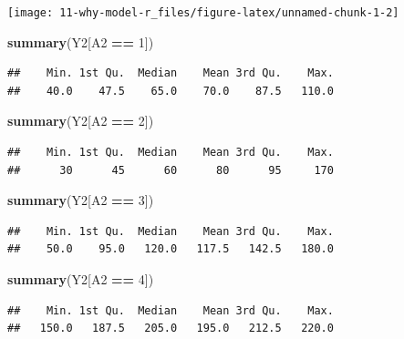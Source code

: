 \documentclass[
  10pt,
]{book}
\newenvironment{Shaded}{\begin{snugshade}}{\end{snugshade}}
\newcommand{\DecValTok}[1]{\textcolor[rgb]{0.00,0.00,0.81}{#1}}
\newcommand{\KeywordTok}[1]{\textcolor[rgb]{0.13,0.29,0.53}{\textbf{#1}}}
\newcommand{\NormalTok}[1]{#1}
\newcommand{\OperatorTok}[1]{\textcolor[rgb]{0.81,0.36,0.00}{\textbf{#1}}}
\newcommand{\StringTok}[1]{\textcolor[rgb]{0.31,0.60,0.02}{#1}}
\begin{document}
\begin{center}\texttt{[image: 11-why-model-r\_files/figure-latex/unnamed-chunk-1-2]} \end{center}

\begin{Shaded}
\begin{Highlighting}[]
\KeywordTok{summary}\NormalTok{(Y2[A2 }\OperatorTok{==}\StringTok{ }\DecValTok{1}\NormalTok{])}
\end{Highlighting}
\end{Shaded}

\begin{verbatim}
##    Min. 1st Qu.  Median    Mean 3rd Qu.    Max. 
##    40.0    47.5    65.0    70.0    87.5   110.0
\end{verbatim}

\begin{Shaded}
\begin{Highlighting}[]
\KeywordTok{summary}\NormalTok{(Y2[A2 }\OperatorTok{==}\StringTok{ }\DecValTok{2}\NormalTok{])}
\end{Highlighting}
\end{Shaded}

\begin{verbatim}
##    Min. 1st Qu.  Median    Mean 3rd Qu.    Max. 
##      30      45      60      80      95     170
\end{verbatim}

\begin{Shaded}
\begin{Highlighting}[]
\KeywordTok{summary}\NormalTok{(Y2[A2 }\OperatorTok{==}\StringTok{ }\DecValTok{3}\NormalTok{])}
\end{Highlighting}
\end{Shaded}

\begin{verbatim}
##    Min. 1st Qu.  Median    Mean 3rd Qu.    Max. 
##    50.0    95.0   120.0   117.5   142.5   180.0
\end{verbatim}

\begin{Shaded}
\begin{Highlighting}[]
\KeywordTok{summary}\NormalTok{(Y2[A2 }\OperatorTok{==}\StringTok{ }\DecValTok{4}\NormalTok{])}
\end{Highlighting}
\end{Shaded}

\begin{verbatim}
##    Min. 1st Qu.  Median    Mean 3rd Qu.    Max. 
##   150.0   187.5   205.0   195.0   212.5   220.0
\end{verbatim}
\end{document}
